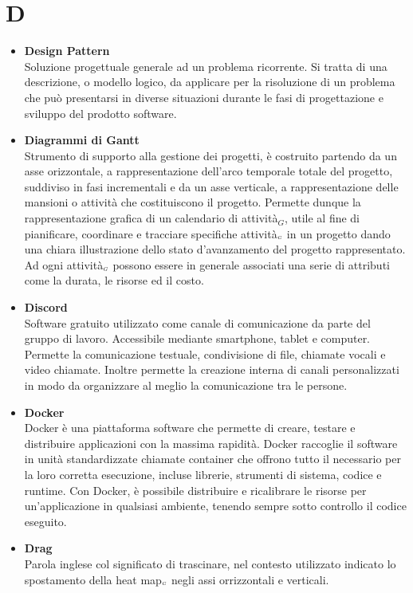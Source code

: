 \chapter{D} \label{D}
	\begin{itemize}		
		\item \textbf{Design Pattern}\\
		Soluzione progettuale generale ad un problema ricorrente. Si tratta di una descrizione, o modello logico, da applicare per la risoluzione di un problema che può presentarsi in diverse situazioni durante le fasi di progettazione e sviluppo del prodotto software.
		
		\item \textbf{Diagrammi di Gantt}\\
		Strumento di supporto alla gestione dei progetti, è costruito partendo da un asse orizzontale, a rappresentazione dell'arco temporale totale del progetto, suddiviso in fasi incrementali  e da un asse verticale, a rappresentazione delle mansioni o attività che costituiscono il progetto. Permette dunque la rappresentazione grafica di un calendario di attività$_G$, utile al fine di pianificare, coordinare e tracciare specifiche attività$_{\scaleto{G}{3pt}}$ in un progetto dando una chiara illustrazione dello stato d'avanzamento del progetto rappresentato.  Ad ogni attività$_{\scaleto{G}{3pt}}$ possono essere in generale associati una serie di attributi come la durata, le risorse ed il costo.
		
		\item \textbf{Discord}\\
		Software gratuito utilizzato come canale di comunicazione da parte del gruppo di lavoro.
		Accessibile mediante smartphone, tablet e computer.
		Permette la comunicazione testuale, condivisione di file, chiamate vocali e video chiamate.
		Inoltre permette la creazione interna di canali personalizzati in modo da organizzare al meglio la comunicazione tra le persone.
		
		\item \textbf{Docker}\\
		Docker è una piattaforma software che permette di creare, testare e distribuire applicazioni con la massima rapidità. Docker raccoglie il software in unità standardizzate chiamate container che offrono tutto il necessario per la loro corretta esecuzione, incluse librerie, strumenti di sistema, codice e runtime. Con Docker, è possibile distribuire e ricalibrare le risorse per un'applicazione in qualsiasi ambiente, tenendo sempre sotto controllo il codice eseguito.
		
		\item \textbf{Drag}\\
		Parola inglese col significato di trascinare, nel contesto utilizzato indicato lo spostamento della heat map$_{\scaleto{G}{3pt}}$ negli assi orrizzontali e verticali.
	\end{itemize}